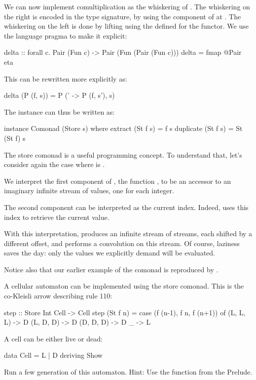 \documentclass[DaoFP]{subfiles}
\begin{document}
We can now implement comultiplication as the whiskering of . The whiskering on the right is encoded in the type signature, by using the component of  at . The whiskering on the left is done by lifting  using the  defined for the  functor. We use the language pragma  to make it explicit:
\begin{haskell}
delta :: forall c. Pair (Fun c) -> Pair (Fun (Pair (Fun c)))
delta = fmap @Pair eta
\end{haskell}
This can be rewritten more explicitly as:
\begin{haskell}
delta (P (f, s)) = P (\s' -> P (f, s'), s)
\end{haskell}

The  instance can thus be written as:
\begin{haskell}
instance Comonad (Store s) where
  extract (St f s) = f s
  duplicate (St f s) = St (St f) s
\end{haskell}

The store comonad is a useful programming concept. To understand that, let's consider again the case where  is . 

We interpret the first component of , the function , to be an accessor to an imaginary infinite stream of values, one for each integer. 

The second component can be interpreted as the current index. Indeed,  uses this index to retrieve the current value.

With this interpretation,  produces an infinite stream of streams, each shifted by a different offset, and  performs a convolution on this stream. Of course, laziness saves the day: only the values we explicitly demand will be evaluated.

Notice also that our earlier example of the  comonad is reproduced by .

\begin{exercise}
A cellular automaton can be implemented using the store comonad. This is the co-Kleisli arrow describing rule 110:
\begin{haskell}
step :: Store Int Cell -> Cell
step (St f n) = 
    case (f (n-1), f n, f (n+1)) of
    (L, L, L) -> D
    (L, D, D) -> D
    (D, D, D) -> D
    _ -> L
\end{haskell}
A cell can be either live or dead:
\begin{haskell}
data Cell = L | D 
    deriving Show
\end{haskell}
Run a few generation of this automaton. Hint: Use the function  from the Prelude.
\end{exercise}
\end{document}
